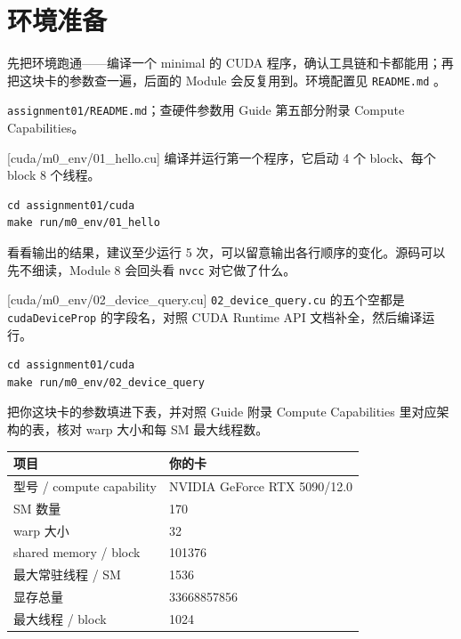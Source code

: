 \documentclass[11pt,a4paper,fontset=none]{ctexart}
\begin{document}
\setcounter{section}{-1}

\section{环境准备}

先把环境跑通——编译一个 minimal 的 CUDA 程序，确认工具链和卡都能用；再把这块卡的参数查一遍，后面的 Module 会反复用到。环境配置见 \texttt{README.md} 。

\begin{reading}
\texttt{assignment01/README.md}；查硬件参数用 Guide 第五部分附录 Compute Capabilities。
\end{reading}

[cuda/m0\_env/01\_hello.cu]
编译并运行第一个程序，它启动 4 个 block、每个 block 8 个线程。

\begin{lstlisting}
cd assignment01/cuda
make run/m0_env/01_hello
\end{lstlisting}

看看输出的结果，建议至少运行 5 次，可以留意输出各行顺序的变化。源码可以先不细读，Module 8 会回头看 \texttt{nvcc} 对它做了什么。

[cuda/m0\_env/02\_device\_query.cu]
\texttt{02\_device\_query.cu} 的五个空都是 \texttt{cudaDeviceProp} 的字段名，对照 CUDA Runtime API 文档补全，然后编译运行。

\begin{lstlisting}
cd assignment01/cuda
make run/m0_env/02_device_query
\end{lstlisting}

把你这块卡的参数填进下表，并对照 Guide 附录 Compute Capabilities 里对应架构的表，核对 warp 大小和每 SM 最大线程数。

\begin{center}\small
\begin{tabular}{@{}ll@{}}
\toprule
项目 & 你的卡 \\
\midrule
型号 / compute capability & NVIDIA GeForce RTX 5090/12.0\\
SM 数量 & 170\\
warp 大小 & 32\\
shared memory / block & 101376\\
最大常驻线程 / SM & 1536\\
显存总量 & 33668857856\\
最大线程 / block & 1024\\
\bottomrule
\end{tabular}
\end{center}
\end{document}
